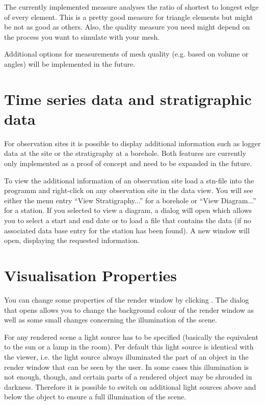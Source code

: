 The currently implemented measure analyses the ratio of shortest to longest edge of every element. This is a pretty good measure for triangle elements but might be not as good as others. Also, the quality measure you need might depend on the process you want to simulate with your mesh.

Additional options for measurements of mesh quality (e.g. based on volume or angles) will be implemented in the future.

\section{Time series data and stratigraphic data}

For observation sites it is possible to display additional information such as logger data at the site or the stratigraphy at a borehole. Both features are currently only implemented as a proof of concept and need to be expanded in the future.

To view the additional information of an observation site load a stn-file into the programm and right-click on any observation site in the data view. You will see either the menu entry ``View Stratigraphy...'' for a borehole or ``View Diagram...'' for a station. If you selected to view a diagram, a dialog will open which allows you to select a start and end date or to load a file that contains the data (if no associated data base entry for the station has been found). A new window will open, displaying the requested information.

\section{Visualisation Properties}

You can change some properties of the render window by clicking  . The dialog that opens allows you to change the background colour of the render window as well as some small changes concerning the illumination of the scene.

For any rendered scene a light source has to be specified (basically the equivalent to the sun or a lamp in the room). Per default this light source is identical with the viewer, i.e. the light source always illuminated the part of an object in the render window that can be seen by the user. In some cases this illumination is not enough, though, and certain parts of a rendered object may be shrouded in darkness. Therefore it is possible to switch on additional light sources above and below the object to ensure a full illumination of the scene.

